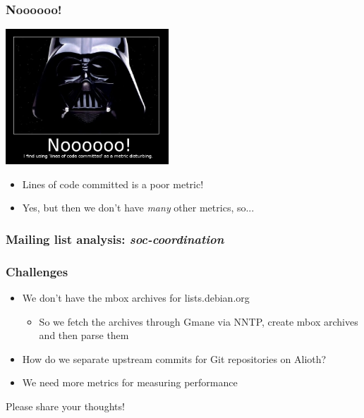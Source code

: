 \documentclass[compress]{beamer}
\begin{document}
\begin{frame}
    \frametitle{Noooooo!}
        \begin{center}
            \includegraphics[height=2.0in]{vaderno.jpg}
        \end{center}
        \pause
        \begin{itemize}
            \item Lines of code committed is a poor metric!
            \pause
            \item Yes, but then we don't have \textit{many} other metrics, so...
        \end{itemize}
\end{frame}

\begin{frame}
    \frametitle{Mailing list analysis: \textit{soc-coordination}}
\end{frame}

\begin{frame}
    \frametitle{Challenges}
    \begin{itemize}
    \item We don't have the mbox archives for lists.debian.org
        \begin{itemize}
        \pause
        \item So we fetch the archives through Gmane via NNTP, create mbox archives and then parse them
        \end{itemize}
    \pause
    \item How do we separate upstream commits for Git repositories on Alioth?
    \pause
    \item We need more metrics for measuring performance
    \pause
    \end{itemize}
    \center Please share your thoughts! 
\end{frame}
\end{document}
